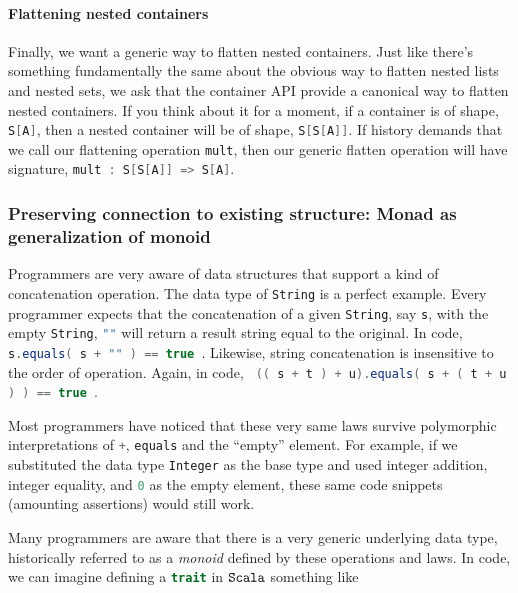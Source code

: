 \paragraph{Flattening nested containers} Finally, we want a generic
way to flatten nested containers. Just like there's something
fundamentally the same about the obvious way to flatten nested lists
and nested sets, we ask that the container API provide a canonical way
to flatten nested containers. If you think about it for a moment, if a
container is of shape, \lstinline[language=Scala]!S[A]!, then a nested container will be
of shape, \lstinline[language=Scala]!S[S[A]]!. If history demands that we call our
flattening operation \lstinline[language=Scala]!mult!, then our generic flatten operation
will have signature, \lstinline[language=Scala]!mult : S[S[A]] => S[A]!.

\subsubsection{Preserving connection to existing structure: Monad as
  generalization of monoid}

Programmers are very aware of data structures that support a kind of
concatenation operation. The data type of \lstinline[language=Scala]!String! is a perfect
example. Every programmer expects that the concatenation of a given
\lstinline[language=Scala]!String!, say \lstinline[language=Scala]!s!, with the empty \lstinline[language=Scala]!String!,
\lstinline[language=Scala]!""! will return a result string equal to the original. In
code, \lstinline[language=Scala]! s.equals( s + "" ) == true !. Likewise, string
concatenation is insensitive to the order of operation. Again, in
code, \lstinline[language=Scala]! (( s + t ) + u).equals( s + ( t + u ) ) == true !.

Most programmers have noticed that these very same laws survive
polymorphic interpretations of \lstinline[language=Scala]!+!, \lstinline[language=Scala]!equals! and the
``empty'' element. For example, if we substituted the data type
\lstinline[language=Scala]!Integer! as the base type and used integer addition, integer
equality, and \lstinline[language=Scala]!0! as the empty element, these same code
snippets (amounting assertions) would still work.

Many programmers are aware that there is a very generic underlying
data type, historically referred to as a \emph{monoid} defined by
these operations and laws. In code, we can imagine defining a
\lstinline[language=Scala]!trait! in $\texttt{Scala}$ something like

